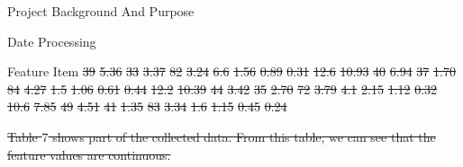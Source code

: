 \documentclass[
 size=14pt,
 paper=smartboard,  %
 mode=present, 		%
 display=slides, 	%
 style=tuliplab,  	%
 pauseslide,
 fleqn,leqno]{powerdot}
\providecommand{\DIFdeltex}[1]{{\protect\color{red}\sout{#1}}}                      %
\providecommand{\DIFdelend}{} %
\providecommand{\DIFdelFL}[1]{\DIFdel{#1}} %
\providecommand{\DIFdel}[1]{\texorpdfstring{\DIFdeltex{#1}}{}} %
\DeclareRobustCommand{\DIFdelend}{\DIFOaddend \let\includegraphics\DIFOincludegraphics} %
\begin{document}
\begin{slide}
\begin{slide}{Project Background And Purpose}
\begin{slide}{Date Processing}
\begin{slide}{Feature Item}
\DIFdelFL{39 }%
\DIFdelFL{5.36 }%
\DIFdelFL{33 }%
\DIFdelFL{3.37 }%
\DIFdelFL{82 }%
\DIFdelFL{3.24}%
\DIFdelFL{6.6}%
\DIFdelFL{1.56}%
\DIFdelFL{0.89}%
\DIFdelFL{0.31 }%
\DIFdelFL{12.6 }%
\DIFdelFL{10.93 }%
\DIFdelFL{40 }%
\DIFdelFL{6.94 }%
\DIFdelFL{37 }%
\DIFdelFL{1.70 }%
\DIFdelFL{84 }%
\DIFdelFL{4.27}%
\DIFdelFL{1.5}%
\DIFdelFL{1.06}%
\DIFdelFL{0.61}%
\DIFdelFL{0.44 }%
\DIFdelFL{12.2 }%
\DIFdelFL{10.39 }%
\DIFdelFL{44 }%
\DIFdelFL{3.42 }%
\DIFdelFL{35 }%
\DIFdelFL{2.70 }%
\DIFdelFL{72 }%
\DIFdelFL{3.79}%
\DIFdelFL{4.1}%
\DIFdelFL{2.15}%
\DIFdelFL{1.12}%
\DIFdelFL{0.32 }%
\DIFdelFL{10.6 }%
\DIFdelFL{7.85  }%
\DIFdelFL{49 }%
\DIFdelFL{4.51 }%
\DIFdelFL{41 }%
\DIFdelFL{1.35 }%
\DIFdelFL{83 }%
\DIFdelFL{3.34}%
\DIFdelFL{1.6}%
\DIFdelFL{1.15 }%
\DIFdelFL{0.45}%
\DIFdelFL{0.24 }%

\DIFdel{Table $7$ shows part of the collected data.
From this table, we can see that the feature values are continuous.
}%

\DIFdelend %



\end{slide}
\end{slide}
\end{slide}
\end{slide}
\end{document}
